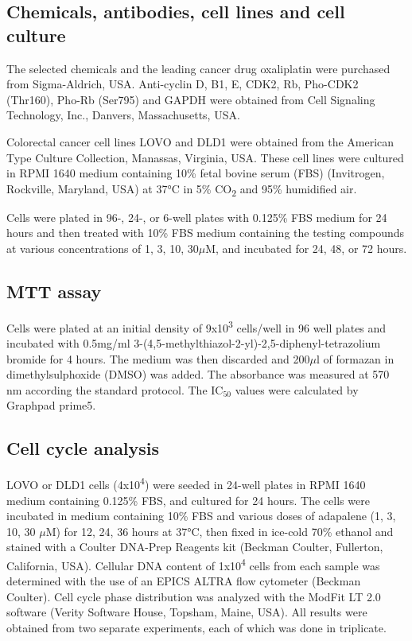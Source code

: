 \subsection{Chemicals, antibodies, cell lines and cell culture}

The selected chemicals and the leading cancer drug oxaliplatin were purchased from Sigma-Aldrich, USA. Anti-cyclin D, B1, E, CDK2, Rb, Pho-CDK2 (Thr160), Pho-Rb (Ser795) and GAPDH were obtained from Cell Signaling Technology, Inc., Danvers, Massachusetts, USA.

Colorectal cancer cell lines LOVO and DLD1 were obtained from the American Type Culture Collection, Manassas, Virginia, USA. These cell lines were cultured in RPMI 1640 medium containing 10\% fetal bovine serum (FBS) (Invitrogen, Rockville, Maryland, USA) at 37°C in 5\% CO\textsubscript{2} and 95\% humidified air.

Cells were plated in 96-, 24-, or 6-well plates with 0.125\% FBS medium for 24 hours and then treated with 10\% FBS medium containing the testing compounds at various concentrations of 1, 3, 10, 30$\mu$M, and incubated for 24, 48, or 72 hours.

\subsection{MTT assay}

Cells were plated at an initial density of 9x10\textsuperscript{3} cells/well in 96 well plates and incubated with 0.5mg/ml 3-(4,5-methylthiazol-2-yl)-2,5-diphenyl-tetrazolium bromide for 4 hours. The medium was then discarded and 200$\mu$l of formazan in dimethylsulphoxide (DMSO) was added. The absorbance was measured at 570 nm according the standard protocol. The IC$_{50}$ values were calculated by Graphpad prime5.

\subsection{Cell cycle analysis}

LOVO or DLD1 cells (4x10\textsuperscript{4}) were seeded in 24-well plates in RPMI 1640 medium containing 0.125\% FBS, and cultured for 24 hours. The cells were incubated in medium containing 10\% FBS and various doses of adapalene (1, 3, 10, 30 $\mu$M) for 12, 24, 36 hours at 37°C, then fixed in ice-cold 70\% ethanol and stained with a Coulter DNA-Prep Reagents kit (Beckman Coulter, Fullerton, California, USA). Cellular DNA content of 1x10\textsuperscript{4} cells from each sample was determined with the use of an EPICS ALTRA flow cytometer (Beckman Coulter). Cell cycle phase distribution was analyzed with the ModFit LT 2.0 software (Verity Software House, Topsham, Maine, USA). All results were obtained from two separate experiments, each of which was done in triplicate.

